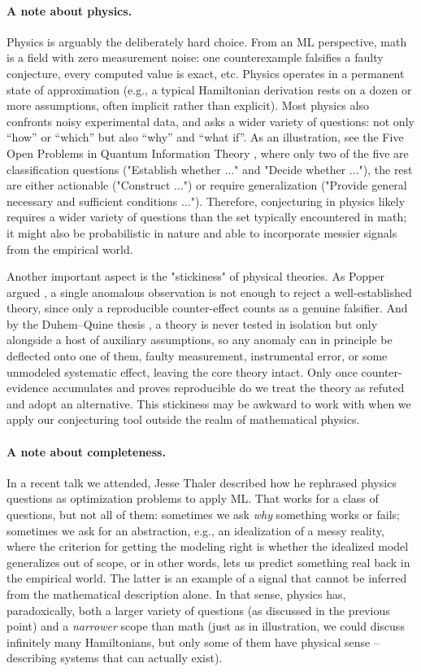 \paragraph{A note about physics.}
Physics is arguably the deliberately hard choice. From an ML perspective, math is a field with zero measurement noise: one counterexample falsifies a faulty conjecture, every computed value is exact, etc. Physics operates in a permanent state of approximation (e.g., a typical Hamiltonian derivation rests on a dozen or more assumptions, often implicit rather than explicit). Most physics also confronts noisy experimental data, and asks a wider variety of questions: not only ``how'' or ``which'' but also ``why'' and ``what if''. As an illustration, see the Five Open Problems in Quantum Information Theory \cite{Horodecki2022},
where only two of the five are classification questions ("Establish whether ..." and "Decide whether ..."), the rest are either actionable ("Construct ...") or require generalization ("Provide general necessary and sufficient conditions ..."). Therefore, conjecturing in physics likely requires a wider variety of questions than the set typically encountered in math; it might also be probabilistic in nature and able to incorporate messier signals from the empirical world.

Another important aspect is the "stickiness" of physical theories. As Popper argued \cite{Popper1959}, a single anomalous observation is not enough to reject a well-established theory, since only a reproducible counter-effect counts as a genuine falsifier. And by the Duhem–Quine thesis \cite{Duhem1954, Quine1951}, a theory is never tested in isolation but only alongside a host of auxiliary assumptions, so any anomaly can in principle be deflected onto one of them, faulty measurement, instrumental error, or some unmodeled systematic effect, leaving the core theory intact. Only once counter-evidence accumulates and proves reproducible do we treat the theory as refuted and adopt an alternative. This stickiness may be awkward to work with when we apply our conjecturing tool outside the realm of mathematical physics.

\paragraph{A note about completeness.}
In a recent talk we attended, Jesse Thaler described how he rephrased physics questions as optimization problems to apply ML. That works for a class of questions, but not all of them: sometimes we ask \emph{why} something works or fails; sometimes we ask for an abstraction, e.g., an idealization of a messy reality, where the criterion for getting the modeling right is whether the idealized model generalizes out of scope, or in other words, lets us predict something real back in the empirical world. The latter is an example of a signal that cannot be inferred from the mathematical description alone. In that sense, physics has, paradoxically, both a larger variety of questions (as discussed in the previous point) and a \emph{narrower} scope than math (just as in illustration, we could discuss infinitely many Hamiltonians, but only some of them have physical sense -- describing systems that can actually exist).

